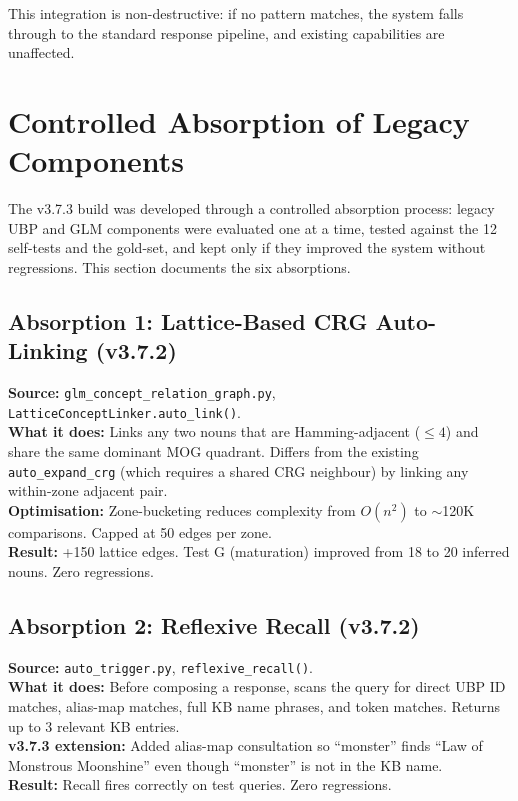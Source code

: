 \documentclass[11pt,a4paper]{article}
\begin{document}
This integration is non-destructive: if no pattern matches, the system falls through to the standard response pipeline, and existing capabilities are unaffected.

\section{Controlled Absorption of Legacy Components}
\label{sec:absorption}

The v3.7.3 build was developed through a controlled absorption process: legacy UBP and GLM components were evaluated one at a time, tested against the 12 self-tests and the gold-set, and kept only if they improved the system without regressions. This section documents the six absorptions.

\subsection{Absorption 1: Lattice-Based CRG Auto-Linking (v3.7.2)}

\textbf{Source:} \texttt{glm\_concept\_relation\_graph.py}, \texttt{LatticeConceptLinker.auto\_link()}. \\
\textbf{What it does:} Links any two nouns that are Hamming-adjacent ($\leq 4$) and share the same dominant MOG quadrant. Differs from the existing \texttt{auto\_expand\_crg} (which requires a shared CRG neighbour) by linking any within-zone adjacent pair. \\
\textbf{Optimisation:} Zone-bucketing reduces complexity from $O(n^2)$ to $\sim$120K comparisons. Capped at 50 edges per zone. \\
\textbf{Result:} +150 lattice edges. Test G (maturation) improved from 18 to 20 inferred nouns. Zero regressions.

\subsection{Absorption 2: Reflexive Recall (v3.7.2)}

\textbf{Source:} \texttt{auto\_trigger.py}, \texttt{reflexive\_recall()}. \\
\textbf{What it does:} Before composing a response, scans the query for direct UBP ID matches, alias-map matches, full KB name phrases, and token matches. Returns up to 3 relevant KB entries. \\
\textbf{v3.7.3 extension:} Added alias-map consultation so ``monster'' finds ``Law of Monstrous Moonshine'' even though ``monster'' is not in the KB name. \\
\textbf{Result:} Recall fires correctly on test queries. Zero regressions.
\end{document}
